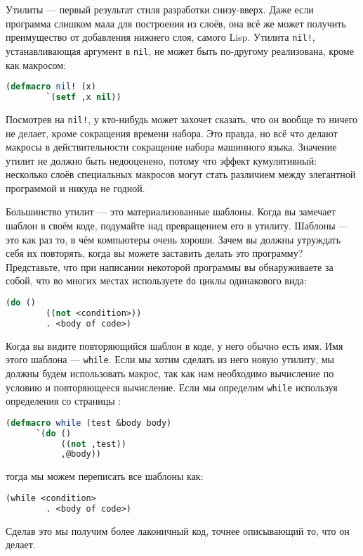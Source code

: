 \documentclass[12pt, a4paper]{article} %
\begin{document}
Утилиты --- первый результат стиля разработки снизу-вверх. Даже если программа слишком мала для построения из слоёв, она всё же может получить преимущество от добавления нижнего слоя, самого Lisp. Утилита \texttt{nil!}, устанавливающая аргумент в \texttt{nil}, не может быть по-другому реализована, кроме как макросом:
\begin{lstlisting}[language=Lisp]
    (defmacro nil! (x)
        `(setf ,x nil))
\end{lstlisting}
Посмотрев на \texttt{nil!}, у кто-нибудь может захочет сказать, что он вообще то ничего не делает, кроме сокращения времени набора. Это правда, но всё что делают макросы в действительности сокращение набора машинного языка. Значение утилит не должно быть недооценено, потому что эффект кумулятивный: несколько слоёв специальных макросов могут стать различием между элегантной программой и никуда не годной.

Большинство утилит --- это материализованные шаблоны. Когда вы замечает шаблон в своём коде, подумайте над превращением его в утилиту. Шаблоны --- это как раз то, в чём компьютеры очень хороши. Зачем вы должны утруждать себя их повторять, когда вы можете заставить делать это программу? Представьте, что при написании некоторой программы вы обнаруживаете за собой, что во многих местах используете \texttt{do} циклы одинакового вида:
\begin{lstlisting}[language=Lisp]
    (do ()
        ((not <condition>))
        . <body of code>)
\end{lstlisting}
Когда вы видите повторяющийся шаблон в коде, у него обычно есть имя. Имя этого шаблона --- \texttt{while}. Если мы хотим сделать из него новую утилиту, мы должны будем использовать макрос, так как нам необходимо вычисление по условию и повторяющееся вычисление. Если мы определим \texttt{while} используя определения со страницы \pageref{91}:
\begin{lstlisting}[language=Lisp]
    (defmacro while (test &body body)
      `(do ()
           ((not ,test))
           ,@body))
\end{lstlisting}
тогда мы можем переписать все шаблоны как:
\begin{lstlisting}[language=Lisp]
    (while <condition>
        . <body of code>)
\end{lstlisting}
Сделав это мы получим более лаконичный код, точнее описывающий то, что он делает.
\end{document}
